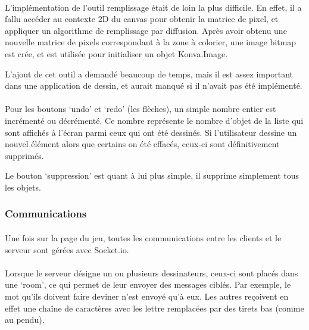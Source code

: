 \documentclass[11pt,a4paper]{article}
\begin{document}
                \paragraph{}
                L'implémentation de l'outil remplissage était de loin la plus difficile.
                En effet, il a fallu accéder au contexte 2D du canvas pour obtenir la matrice de pixel,
                et appliquer un algorithme de remplissage par diffusion.
                Après avoir obtenu une nouvelle matrice de pixels correspondant à la zone à colorier,
                une image bitmap est crée, et est utilisée pour initialiser un objet Konva.Image.

                L'ajout de cet outil a demandé beaucoup de temps,
                mais il est assez important dans une application de dessin,
                et aurait manqué si il n'avait pas été implémenté.
                \paragraph{}
                Pour les boutons `undo' et `redo' (les flèches), un simple nombre entier est incrémenté ou décrémenté.
                Ce nombre représente le nombre d'objet de la liste qui sont affichés à l'écran parmi ceux qui ont été dessinés.
                Si l'utilisateur dessine un nouvel élément alors que certains on été effacés,
                ceux-ci sont définitivement supprimés.

                Le bouton `suppression' est quant à lui plus simple, il supprime simplement tous les objets.
            \subsubsection{Communications}
                \paragraph{}
                Une fois sur la page du jeu, toutes les communications entre les clients et le serveur sont gérées avec Socket.io.
                \paragraph{}
                Lorsque le serveur désigne un ou plusieurs dessinateurs, ceux-ci sont placés dans une `room',
                ce qui permet de leur envoyer des messages ciblés.
                Par exemple, le mot qu'ils doivent faire deviner n'est envoyé qu'à eux.
                Les autres reçoivent en effet une chaîne de caractères avec les lettre remplacées par des tirets bas (comme au pendu).
\end{document}
